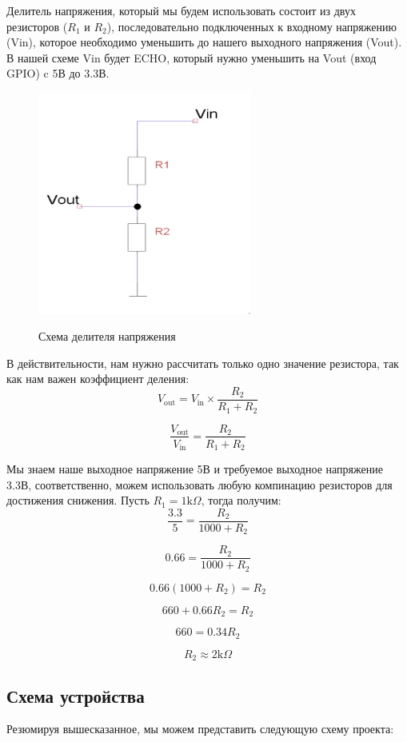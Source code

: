 \documentclass[a4paper, 14pt]{article}
\begin{document}
Делитель напряжения, который мы будем использовать состоит из двух резисторов ($R_1$ и $R_2$), последовательно подключенных к входному напряжению (Vin), которое необходимо уменьшить до нашего выходного напряжения (Vout). В нашей схеме Vin будет ECHO, который нужно уменьшить на Vout (вход GPIO) c 5В до 3.3В.

\begin{figure}[H]
	\centering
	\includegraphics[width=7cm]{screenshots/2.png}\\
	\caption{Схема делителя напряжения}
\end{figure}

В действительности, нам нужно рассчитать только одно значение резистора, так как нам важен коэффициент деления:
$$V_\text{out} = V_\text{in} \times \frac{R_2}{R_1 + R_2}$$

$$\frac{V_\text{out}}{V_\text{in}} = \frac{R_2}{R_1+R_2}$$

Мы знаем наше выходное напряжение 5В и требуемое выходное напряжение 3.3В, соответственно, можем использовать любую компинацию резисторов для достижения снижения. Пусть $R_1 = 1\text{k}\Omega$, тогда получим:
$$\frac{3.3}{5}=\frac{R_2}{1000+R_2}$$

$$0.66=\frac{R_2}{1000+R_2}$$

$$0.66(1000+R_2) = R_2$$

$$660 + 0.66R_2 = R_2$$

$$660 = 0.34R_2$$

$$R_2 \approx 2\text{k}\Omega$$

\subsection{Схема устройства}

Резюмируя вышесказанное, мы можем представить следующую схему проекта:
\end{document}
